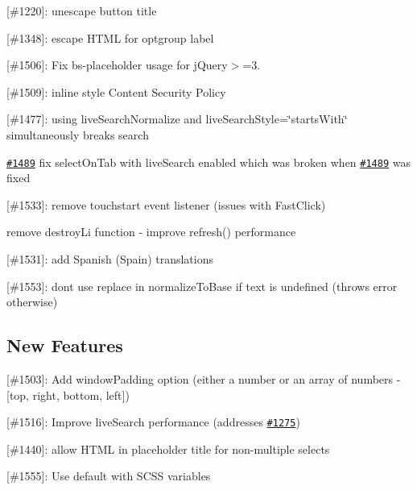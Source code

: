 \begin{DoxyItemize}
\item \mbox{[}\#1220\mbox{]}\+: unescape button title
\item \mbox{[}\#1348\mbox{]}\+: escape H\+T\+ML for optgroup label
\item \mbox{[}\#1506\mbox{]}\+: Fix bs-\/placeholder usage for j\+Query$>$=3.
\item \mbox{[}\#1509\mbox{]}\+: inline style Content Security Policy
\item \mbox{[}\#1477\mbox{]}\+: using live\+Search\+Normalize and live\+Search\+Style=\char`\"{}starts\+With\char`\"{} simultaneously breaks search
\item \href{https://github.com/silviomoreto/bootstrap-select/issues/1489}{\tt \#1489} fix select\+On\+Tab with live\+Search enabled which was broken when \href{https://github.com/silviomoreto/bootstrap-select/issues/1489}{\tt \#1489} was fixed
\item \mbox{[}\#1533\mbox{]}\+: remove touchstart event listener (issues with Fast\+Click)
\item remove destroy\+Li function -\/ improve refresh() performance
\item \mbox{[}\#1531\mbox{]}\+: add Spanish (Spain) translations
\item \mbox{[}\#1553\mbox{]}\+: don\textquotesingle{}t use replace in normalize\+To\+Base if text is undefined (throws error otherwise)
\end{DoxyItemize}

\subsection*{New Features}


\begin{DoxyItemize}
\item \mbox{[}\#1503\mbox{]}\+: Add window\+Padding option (either a number or an array of numbers -\/ \mbox{[}top, right, bottom, left\mbox{]})
\item \mbox{[}\#1516\mbox{]}\+: Improve live\+Search performance (addresses \href{https://github.com/silviomoreto/bootstrap-select/issues/1275}{\tt \#1275})
\item \mbox{[}\#1440\mbox{]}\+: allow H\+T\+ML in placeholder title for non-\/multiple selects
\item \mbox{[}\#1555\mbox{]}\+: Use default with S\+C\+SS variables
\end{DoxyItemize}





